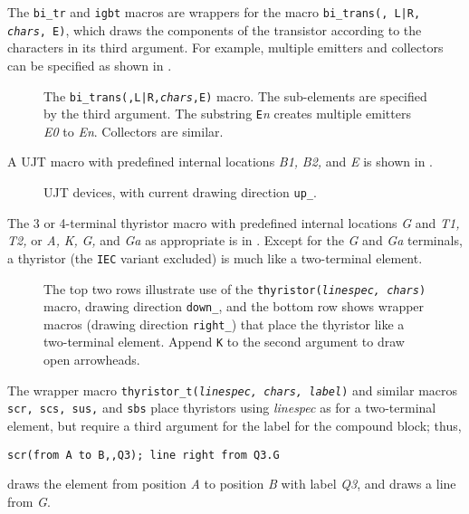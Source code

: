 The {\tt bi\_tr} and {\tt igbt} macros are wrappers for
the macro {\tt bi\_trans(\linespec, L|R, {\sl chars}, E)}, which
draws the components of the transistor according to the characters in its
third argument.  For example, multiple emitters and collectors can be
specified as shown in .
\begin{figure}[h!t]
   
   \caption{The {\tt bi\_trans(\linespec,L|R,{\sl chars},E)} macro.
   The sub-elements are specified by the third argument.  The substring
   {\tt E}{\sl n} creates multiple emitters {\sl E0} to {\sl En}.
   Collectors are similar.}
   \label{bitrans}
   \end{figure}

A UJT macro with predefined internal locations {\sl B1,} {\sl B2,}
and {\sl E} is shown in .
\begin{figure}[h!t]
   
   \caption{UJT devices, with current drawing direction {\tt up\_}. }
   \label{ujt}
   \end{figure}

The 3 or 4-terminal thyristor macro with predefined internal locations
 {\sl G} and {\sl T1,} {\sl T2,} or
 {\sl A,} {\sl K,} {\sl G,} and {\sl Ga} 
 as appropriate is in .
Except for the {\sl G} and {\sl Ga} terminals,
a thyristor (the {\tt IEC} variant excluded)
is much like a two-terminal element.
\begin{figure}[H]
   
   \vspace*{-1ex}
   \caption{The top two rows illustrate use of the
    {\tt thyristor({\sl linespec, chars})} macro,
    drawing direction {\tt down\_}, and the bottom row shows wrapper
    macros (drawing direction {\tt right\_}) that place
    the thyristor like a two-terminal element. Append {\tt K}
    to the second argument to draw open arrowheads.}
   \label{thyristor}
   \end{figure}
The wrapper macro
{\tt thyristor\_t({\sl linespec, chars, label})} and similar macros
{\tt scr, scs, sus,} and {\tt sbs}
place thyristors using {\sl linespec} as for a two-terminal element,
but require a third argument for the label for the compound block; thus,

{\tt scr(from A to B,{,}Q3); line right from Q3.G}

\noindent
draws the element from position {\sl A} to position {\sl B} with label
{\sl Q3}, and draws a line from {\sl G}.

